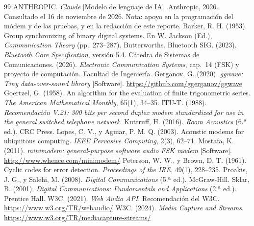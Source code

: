 \documentclass[10pt,twocolumn,letterpaper]{article}
\begin{document}
\begin{thebibliography}{99}\small
\setlength{\itemsep}{2pt}
 ANTHROPIC. \emph{Claude} [Modelo de lenguaje de IA]. Anthropic, 2026. Consultado el 16 de noviembre de 2026. Nota: apoyo en la programación del módem y de las pruebas, y en la redacción de este reporte.
 Barker, R. H. (1953). Group synchronizing of binary digital systems. En W. Jackson (Ed.), \emph{Communication Theory} (pp.~273--287). Butterworths.
 Bluetooth SIG. (2023). \emph{Bluetooth Core Specification}, versión 5.4.
 Cátedra de Sistemas de Comunicaciones. (2026). \emph{Electronic Communication Systems}, cap.~14 (FSK) y proyecto de computación. Facultad de Ingeniería.
 Gerganov, G. (2020). \emph{ggwave: Tiny data-over-sound library} [Software]. \url{https://github.com/ggerganov/ggwave}
 Goertzel, G. (1958). An algorithm for the evaluation of finite trigonometric series. \emph{The American Mathematical Monthly}, 65(1), 34--35.
 ITU-T. (1988). \emph{Recomendación V.21: 300 bits per second duplex modem standardized for use in the general switched telephone network}.
 Kuttruff, H. (2016). \emph{Room Acoustics} (6.ª ed.). CRC Press.
 Lopes, C. V., y Aguiar, P. M. Q. (2003). Acoustic modems for ubiquitous computing. \emph{IEEE Pervasive Computing}, 2(3), 62--71.
 Mostafa, K. (2011). \emph{minimodem: general-purpose software audio FSK modem} [Software]. \url{http://www.whence.com/minimodem/}
 Peterson, W. W., y Brown, D. T. (1961). Cyclic codes for error detection. \emph{Proceedings of the IRE}, 49(1), 228--235.
 Proakis, J. G., y Salehi, M. (2008). \emph{Digital Communications} (5.ª ed.). McGraw-Hill.
 Sklar, B. (2001). \emph{Digital Communications: Fundamentals and Applications} (2.ª ed.). Prentice Hall.
 W3C. (2021). \emph{Web Audio API}. Recomendación del W3C. \url{https://www.w3.org/TR/webaudio/}
 W3C. (2024). \emph{Media Capture and Streams}. \url{https://www.w3.org/TR/mediacapture-streams/}
\end{thebibliography}
\end{document}
